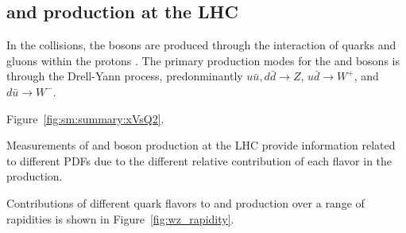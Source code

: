 

\subsection{\W and \Z production at the LHC}
In the \pp collisions, the bosons are produced through the interaction of quarks and gluons within the protons \cite{}. The primary production modes for the \W and \Z bosons is through the Drell-Yann process, predonminantly $u\bar{u}, d\bar{d}\rightarrow Z$,  $u\bar{d}\rightarrow W^+$,  and $d\bar{u}\rightarrow W^-$. 

Figure~\ref{fig:sm:summary:xVsQ2}.







Measurements of \W and \Z boson production at the LHC provide information related to different PDFs due to the different relative contribution of each flavor in the production.

Contributions of different quark flavors to \W and \Z production over a range of rapidities is shown in Figure~\ref{fig:wz_rapidity}. 






